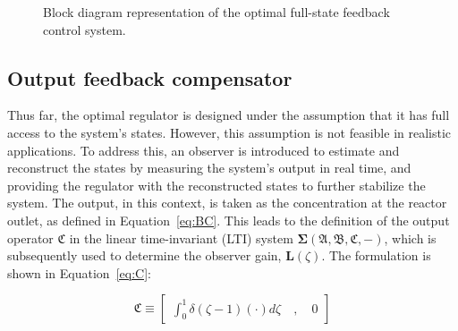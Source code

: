 \begin{figure}[!htbp]
    \centering
    \caption{Block diagram representation of the optimal full-state feedback control system.}
    \label{fig:block_diagram}
\end{figure}

\subsection{Output feedback compensator} \label{sec:output_design}

Thus far, the optimal regulator is designed under the assumption that it has full access to the system's states. However, this assumption is not feasible in realistic applications. To address this, an observer is introduced to estimate and reconstruct the states by measuring the system's output in real time, and providing the regulator with the reconstructed states to further stabilize the system. The output, in this context, is taken as the concentration at the reactor outlet, as defined in Equation~\ref{eq:BC}. This leads to the definition of the output operator $\mathfrak{C}$ in the linear time-invariant (LTI) system $\mathbf{\Sigma(\mathfrak{A},\mathfrak{B},\mathfrak{C},-)}$, which is subsequently used to determine the observer gain, $\bm{L}(\zeta)$. The formulation is shown in Equation~\ref{eq:C}:

\begin{equation} \label{eq:C}
    \mathfrak{C} \equiv \begin{bmatrix}
        \int_0^1 \delta(\zeta-1) ( \cdot ) d\zeta \quad , \quad 0
    \end{bmatrix}
\end{equation}

